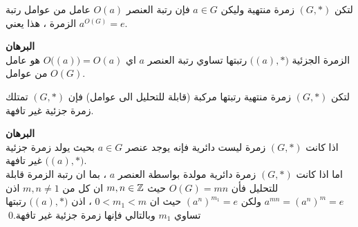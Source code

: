  \begin{corollary}
 	لتكن $(G, *) $ زمرة منتهية وليكن $a\in G$ فإن رتبة العنصر $O(a)$ عامل من عوامل رتبة الزمرة ، هذا يعني $a^{O(G)} =e$.
 \end{corollary}
 \noindent
 \textbf{البرهان}\\
 \noindent
 الزمرة الجزئية $\big((a), *\big)$ رتبتها تساوي رتبة العنصر $a$ اي
 $O\big((a)\big) = O(a)$
 هو عامل من عوامل $O(G)$.
 
 \begin{corollary}
 	لتكن $(G, *)$ زمرة منتهية رتبتها مركبة (قابلة للتحليل الى عوامل) فإن $(G, *)$ تمتلك زمرة جزئية غير تافهة.
 \end{corollary}
 \noindent
 \textbf{البرهان}\\
 \noindent
 اذا كانت $(G, *)$ زمرة ليست دائرية فإنه يوجد عنصر $a\in G$ بحيث يولد زمرة جزئية $\big((a),*\big)$ غير تافهة.\\
 اما اذا كانت $(G, *)$ زمرة دائرية مولدة بواسطة العنصر $a$ ، بما ان رتبة الزمرة قابلة للتحليل فأن $O(G)=mn$ حيث $m,n\in \mathbb{Z}$ ان كل من $m,n\neq 1 $ اذن $a^{mn} = (a^n)^m=e$ ولكن 
 $(a^n)^{m_1} = e$ حيث ان $ 0 < m_1 <m$
 ، اذن 
 $\big((a), *\big)$ رتبتها تساوي $m_1$ وبالتالي فإنها زمرة جزئية غير تافهة.\qed
 
 
 